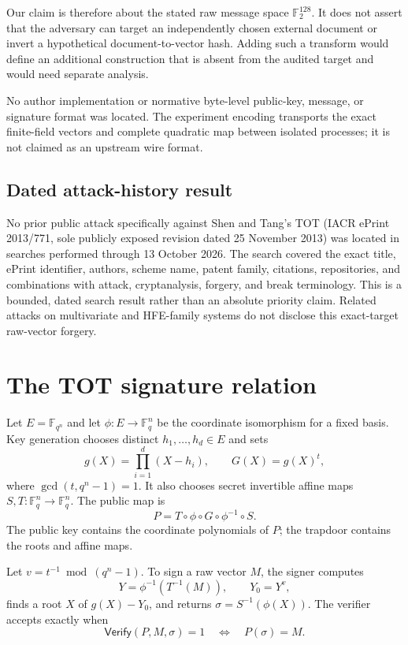\documentclass[10pt,a4paper]{article}
\newcommand{\F}{\mathbb F}
\newcommand{\Verify}{\mathsf{Verify}}
\begin{document}
Our claim is therefore about the stated raw message space $\F_2^{128}$.  It
does not assert that the adversary can target an independently chosen
external document or invert a hypothetical document-to-vector hash.  Adding
such a transform would define an additional construction that is absent from
the audited target and would need separate analysis.

No author implementation or normative byte-level public-key, message, or
signature format was located.  The experiment encoding transports the exact
finite-field vectors and complete quadratic map between isolated processes;
it is not claimed as an upstream wire format.

\subsection{Dated attack-history result}

No prior public attack specifically against Shen and Tang's TOT (IACR ePrint
2013/771, sole publicly exposed revision dated 25 November 2013) was located
in searches performed through 13 October 2026.  The search covered the exact
title, ePrint identifier, authors, scheme name, patent family, citations,
repositories, and combinations with attack, cryptanalysis, forgery, and
break terminology.  This is a bounded, dated search result rather than an
absolute priority claim.  Related attacks on multivariate and HFE-family
systems do not disclose this exact-target raw-vector forgery.

\section{The TOT signature relation}

Let $E=\F_{q^n}$ and let $\phi:E\rightarrow\F_q^n$ be the coordinate
isomorphism for a fixed basis.  Key generation chooses distinct
$h_1,\ldots,h_d\in E$ and sets
\[
  g(X)=\prod_{i=1}^{d}(X-h_i),\qquad G(X)=g(X)^t,
\]
where $\gcd(t,q^n-1)=1$.  It also chooses secret invertible affine maps
$S,T:\F_q^n\rightarrow\F_q^n$.  The public map is
\[
  P=T\circ\phi\circ G\circ\phi^{-1}\circ S.
\]
The public key contains the coordinate polynomials of $P$; the trapdoor
contains the roots and affine maps.

Let $v=t^{-1}\bmod(q^n-1)$.  To sign a raw vector $M$, the signer computes
\[
  Y=\phi^{-1}(T^{-1}(M)),\qquad Y_0=Y^v,
\]
finds a root $X$ of $g(X)-Y_0$, and returns
$\sigma=S^{-1}(\phi(X))$.  The verifier accepts exactly when
\begin{equation}
  \Verify(P,M,\sigma)=1 \quad\Longleftrightarrow\quad P(\sigma)=M.
  \label{eq:verify}
\end{equation}
\end{document}
